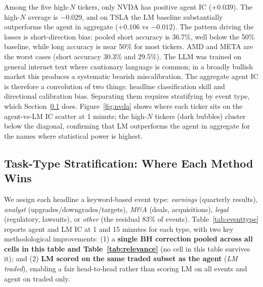 \documentclass[11pt, letterpaper]{article}
\begin{document}
Among the five high-$N$ tickers, only NVDA has positive agent IC ($+0.039$). The
high-$N$ average is $-0.029$, and on TSLA the LM baseline substantially outperforms
the agent in aggregate ($+0.106$ vs $-0.012$). The pattern driving the losses is
short-direction bias: pooled short accuracy is 36.7\%, well below the 50\% baseline,
while long accuracy is near 50\% for most tickers. AMD and META are the worst cases
(short accuracy 30.3\% and 29.5\%). The LLM was trained on general internet text
where cautionary language is common; in a broadly bullish market this produces a
systematic bearish miscalibration. The aggregate agent IC is therefore a convolution of two things:
headline classification skill and directional calibration bias. Separating them requires
stratifying by event type, which Section~\ref{sec:eventtype} does.
Figure~\ref{fig:nvda} shows where each ticker sits on the agent-vs-LM IC scatter at
1 minute; the high-$N$ tickers (dark bubbles) cluster below the diagonal, confirming
that LM outperforms the agent in aggregate for the names where statistical power is
highest.

\subsection{Task-Type Stratification: Where Each Method Wins}
\label{sec:eventtype}

We assign each headline a keyword-based event type:
\textit{earnings} (quarterly results), \textit{analyst} (upgrades/downgrades/targets),
\textit{M\&A} (deals, acquisitions), \textit{legal} (regulatory, lawsuits), or
\textit{other} (the residual 83\% of events). Table~\ref{tab:eventtype} reports agent
and LM IC at 1 and 15 minutes for each type, with two key methodological improvements:
(1) a \textbf{single BH correction pooled across all cells in this table and
Table~\ref{tab:relevance}} (no cell in this table survives it); and (2) \textbf{LM
scored on the same traded subset as the agent} (\textit{LM traded}), enabling a fair
head-to-head rather than scoring LM on all events and agent on traded only.
\end{document}
